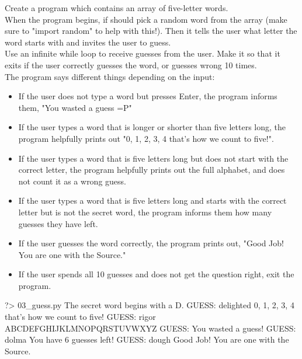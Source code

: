 \documentclass{42-en}
\begin{document}
Create a program which contains an array of five-letter words.\\
When the program begins, if should pick a random word from the array (make sure to "import random" to help with this!). Then it tells the user what letter the word starts with and invites the user to guess.\\

Use an infinite while loop to receive guesses from the user. Make it so that it exits if the user correctly guesses the word, or guesses wrong 10 times.\\

The program says different things depending on the input:
\begin{itemize}
	\item If the user does not type a word but presses Enter, the program informs them, "You wasted a guess =P"
	\item If the user types a word that is longer or shorter than five letters long, the program helpfully prints out "0, 1, 2, 3, 4 that's how we count to five!".
	\item If the user types a word that is five letters long but does not start with the correct letter, the program helpfully prints out the full alphabet, and does not count it as a wrong guess.
	\item If the user types a word that is five letters long and starts with the correct letter but is not the secret word, the program informs them how many guesses they have left.
	\item If the user guesses the word correctly, the program prints out, "Good Job! You are one with the Source."
	\item If the user spends all 10 guesses and does not get the question right, exit the program.
\end{itemize}

\begin{42console}
	?> 03_guess.py
	The secret word begins with a D.
	GUESS: delighted
	0, 1, 2, 3, 4 that's how we count to five!
	GUESS: rigor
	ABCDEFGHIJKLMNOPQRSTUVWXYZ
	GUESS:
	You wasted a guess!
	GUESS: dolma
	You have 6 guesses left!
	GUESS: dough
	Good Job! You are one with the Source.
\end{42console}
\end{document}
